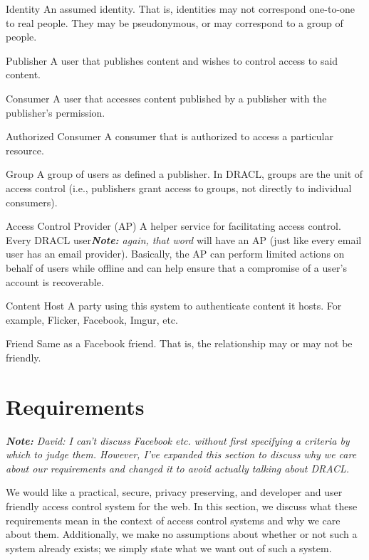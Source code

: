 \documentclass[pdftex,12pt,a4papaer]{report}
\newcommand{\note}[1]{\textit{\textbf{Note:} #1}}
\begin{document}
\begin{compactdesc}
    \item[Identity] An assumed identity. That is, identities may not correspond
      one-to-one to real people. They may be pseudonymous, or may correspond to
      a group of people.
    \item[Publisher] A user that publishes content and wishes to control
      access to said content.
    \item[Consumer] A user that accesses content published by a publisher
      with the publisher's permission.
    \item[Authorized Consumer] A consumer that is authorized to access a
      particular resource.
    \item[Group] A group of users as defined a publisher. In DRACL, groups
      are the unit of access control (i.e., publishers grant access to
      groups, not directly to individual consumers).
    \item[Access Control Provider (AP)] A helper service for facilitating
      access control. Every DRACL user\note{again, that word} will have an AP (just like every email
      user has an email provider). Basically, the AP can perform limited actions on
      behalf of users while offline and can help ensure that a compromise of a user's
      account is recoverable.
    \item[Content Host] A party using this system to authenticate content it
      hosts. For example, Flicker, Facebook, Imgur, etc.
    \item[Friend] Same as a Facebook friend. That is, the relationship may or
      may not be friendly.
\end{compactdesc}

\section{Requirements}

\note{David: I can't discuss Facebook etc. without first specifying a criteria
by which to judge them. However, I've expanded this section to discuss why we
care about our requirements and changed it to avoid actually talking about
DRACL.}

We would like a practical, secure, privacy preserving, and developer and user
friendly access control system for the web. In this section, we discuss what
these requirements mean in the context of access control systems and why we care
about them. Additionally, we make no assumptions about whether or not such a
system already exists; we simply state what we want out of such a system.
\end{document}
